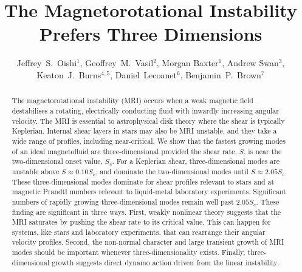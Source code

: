 \documentclass[openacc]{rsproca_new}%
\begin{document}
\title{The Magnetorotational Instability Prefers Three Dimensions}

\author{%
Jeffrey~S.~Oishi$^{1}$, Geoffrey~M.~Vasil$^{2}$, Morgan Baxter$^{1}$,
Andrew Swan$^{3}$, Keaton~J.~Burns$^{4,5}$, Daniel~Lecoanet$^6$, Benjamin~P.~Brown$^7$}

\address{$^{1}$Bates College Department of Physics and Astronomy, Lewiston, ME 04240, USA\\
$^{2}$University of Sydney School of Mathematics and Statistics, Sydney, NSW, Australia\\
$^{3}$Statistical Laboratory, DPMMS, University of Cambridge, Cambridge,
UK\\
$^{4}5$Center for Computational Astrophysics, Flatiron Institute, New York, NY 10010, USA\\
$^{5}$Massachusetts Institute of Technology Department of Physics, Cambridge, MA 02139, USA\\
$^{6}$Princeton University Department of Astrophysical Sciences, Princeton, NJ 08544, USA\\
$^{7}$University of Colorado Laboratory for Atmospheric and Space Physics and Department of Astrophysical and Planetary Sciences, Boulder, CO 80309, USA}

\begin{abstract}
The magnetorotational instability (MRI) occurs when a weak magnetic field destabilises a rotating, electrically conducting fluid with inwardly increasing angular velocity.
The MRI is essential to astrophysical disk theory where the shear is typically Keplerian.
Internal shear layers in stars may also be MRI unstable, and they take a wide range of profiles, including near-critical.
We show that the fastest growing modes of an ideal magnetofluid are three-dimensional provided the shear rate, $S$, is near the two-dimensional onset value, $S_c$.
For a Keplerian shear, three-dimensional modes are unstable above $S\approx0.10S_c$, and dominate the two-dimensional modes until $S\approx2.05S_{c}$.
These three-dimensional modes dominate for shear profiles relevant to stars and at magnetic Prandtl numbers relevant to liquid-metal laboratory experiments.
Significant numbers of rapidly growing three-dimensional modes remain well past $2.05S_{c}$. 
These finding are significant in three ways. 
First, weakly nonlinear theory suggests that the MRI saturates by pushing the shear rate to its critical value. 
This can happen for systems, like stars and laboratory experiments, that can rearrange their angular velocity profiles.
Second, the non-normal character and large transient growth of MRI modes should be important whenever three-dimensionality exists.
Finally, three-dimensional growth suggests direct dynamo action driven from the linear instability.
\end{abstract}
\end{document}
